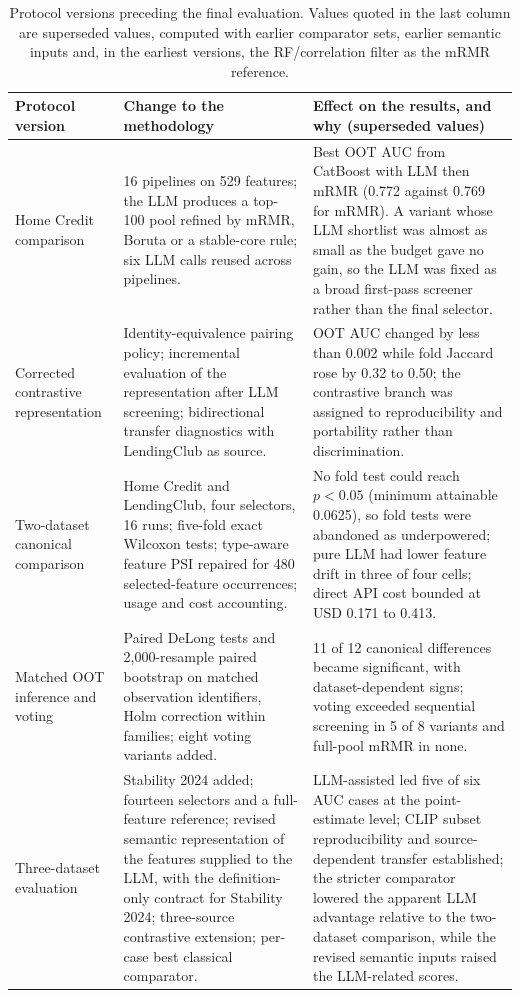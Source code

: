 \documentclass[final,5p,twocolumn]{elsarticle}
\begin{document}
\begin{table}[htbp]
\centering
\scriptsize
\setlength{\tabcolsep}{4pt}
\begin{threeparttable}
\caption{Protocol versions preceding the final evaluation. Values quoted in the last column are superseded values, computed with earlier comparator sets, earlier semantic inputs and, in the earliest versions, the RF/correlation filter as the mRMR reference.}
\label{tab:stages}
\begin{tabular}{@{}L{16mm}L{56mm}L{56mm}@{}}
\toprule
Protocol version & Change to the methodology & Effect on the results, and why (superseded values) \\
\midrule
Home Credit comparison & 16 pipelines on 529 features; the LLM produces a top-100 pool refined by mRMR, Boruta or a stable-core rule; six LLM calls reused across pipelines. & Best OOT AUC from CatBoost with LLM then mRMR (0.772 against 0.769 for mRMR). A variant whose LLM shortlist was almost as small as the budget gave no gain, so the LLM was fixed as a broad first-pass screener rather than the final selector. \\
\addlinespace
Corrected contrastive representation & Identity-equivalence pairing policy; incremental evaluation of the representation after LLM screening; bidirectional transfer diagnostics with LendingClub as source. & OOT AUC changed by less than 0.002 while fold Jaccard rose by 0.32 to 0.50; the contrastive branch was assigned to reproducibility and portability rather than discrimination. \\
\addlinespace
Two-dataset canonical comparison & Home Credit and LendingClub, four selectors, 16 runs; five-fold exact Wilcoxon tests; type-aware feature PSI repaired for 480 selected-feature occurrences; usage and cost accounting. & No fold test could reach $p<0.05$ (minimum attainable 0.0625), so fold tests were abandoned as underpowered; pure LLM had lower feature drift in three of four cells; direct API cost bounded at USD 0.171 to 0.413. \\
\addlinespace
Matched OOT inference and voting & Paired DeLong tests and 2,000-resample paired bootstrap on matched observation identifiers, Holm correction within families; eight voting variants added. & 11 of 12 canonical differences became significant, with dataset-dependent signs; voting exceeded sequential screening in 5 of 8 variants and full-pool mRMR in none. \\
\addlinespace
Three-dataset evaluation & Stability 2024 added; fourteen selectors and a full-feature reference; revised semantic representation of the features supplied to the LLM, with the definition-only contract for Stability 2024; three-source contrastive extension; per-case best classical comparator. & LLM-assisted led five of six AUC cases at the point-estimate level; CLIP subset reproducibility and source-dependent transfer established; the stricter comparator lowered the apparent LLM advantage relative to the two-dataset comparison, while the revised semantic inputs raised the LLM-related scores. \\

\end{tabular}
\end{threeparttable}
\end{table}
\end{document}
